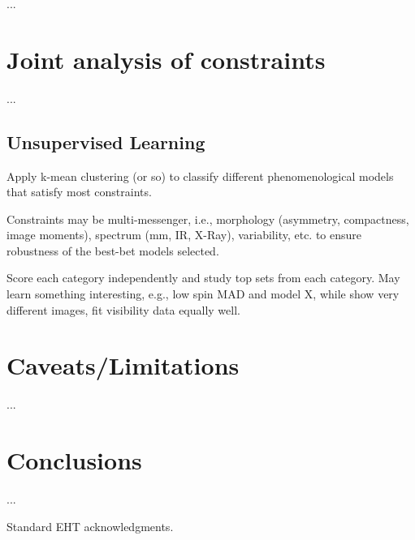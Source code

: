 \documentclass[twocolumn,tighten,dvipsnames]{aastex63}
\newcommand\<{{\langle}}
\renewcommand\>{{\rangle}} %
\begin{document}
...

\section{Joint analysis of constraints}
\label{sec:allconst}

...

\subsection{Unsupervised Learning}
\label{sec:ml}

Apply k-mean clustering (or so) to classify different phenomenological models that satisfy most constraints.

Constraints may be multi-messenger, i.e., morphology (asymmetry, compactness, image moments), spectrum (mm, IR, X-Ray), variability, etc. to ensure robustness of the best-bet models selected.

Score each category independently and study top sets from each category.  May learn something interesting, e.g., low spin MAD and model X, while show very different images, fit visibility data equally well.

\section{Caveats/Limitations}
\label{sec:caveats}

...

\section{Conclusions}
\label{sec:conclusions}

...

\acknowledgments

Standard EHT acknowledgments.

\vspace{5mm}

\end{document}
